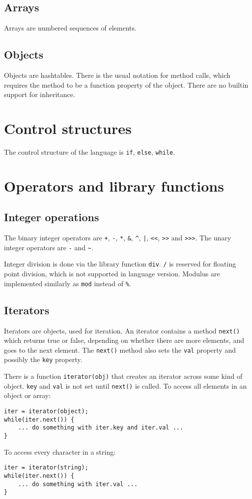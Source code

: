 \subsection{Arrays}

Arrays are numbered sequences of elements.

\subsection{Objects}

Objects are hashtables. 
There is the usual notation for method calls, which requires the method to be a function property of the object.
There are no builtin support for inheritance.


\section{Control structures}

The control structure of the language is \verb|if|, \verb|else|, \verb|while|.

\section{Operators and library functions}

\subsection{Integer operations}

The binary integer operators are
\verb|+|, \verb|-|, \verb|*|, \verb|&|, \verb|^|, \verb$|$, \verb|<<|, \verb|>>| and \verb|>>>|.
The unary integer operators are \verb|-| and \verb|~|.

Integer division is done via the library function \verb|div|. \verb|/| is reserved for floating point division, which is not supported in language version.
Modulus are implemented similarly as \verb|mod| instead of \verb|%|.


\subsection{Iterators}
Iterators are objects, used for iteration. An iterator contains a method \verb|next()| which returns true or false, depending on whether there are more elements, and goes to the next element. The \verb|next()| method also sets the \verb|val| property and possibly the \verb|key| property.

There is a function \verb|iterator(obj)| that creates an iterator across some kind of object. \verb|key| and \verb|val| is not set until \verb|next()| is called. To access all elements in an object or array:
\begin{verbatim}
iter = iterator(object);
while(iter.next()) {
    ... do something with iter.key and iter.val ...
}
\end{verbatim}
To access every character in a string:
\begin{verbatim}
iter = iterator(string);
while(iter.next()) {
    ... do something with iter.val ...
}
\end{verbatim}

